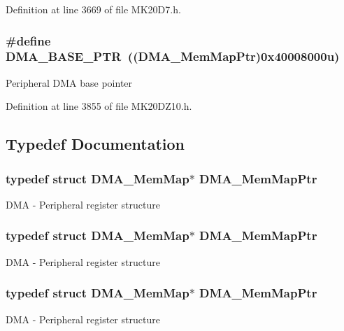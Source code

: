 Definition at line 3669 of file M\+K20\+D7.\+h.

\subsubsection[{\texorpdfstring{D\+M\+A\+\_\+\+B\+A\+S\+E\+\_\+\+P\+TR}{DMA_BASE_PTR}}]{\setlength{\rightskip}{0pt plus 5cm}\#define D\+M\+A\+\_\+\+B\+A\+S\+E\+\_\+\+P\+TR~(({\bf D\+M\+A\+\_\+\+Mem\+Map\+Ptr})0x40008000u)}\hypertarget{group___d_m_a___peripheral_ga6997fbc1b1973e9f27170217a3bd6f22}{}\label{group___d_m_a___peripheral_ga6997fbc1b1973e9f27170217a3bd6f22}
Peripheral D\+MA base pointer 

Definition at line 3855 of file M\+K20\+D\+Z10.\+h.



\subsection{Typedef Documentation}
\subsubsection[{\texorpdfstring{D\+M\+A\+\_\+\+Mem\+Map\+Ptr}{DMA_MemMapPtr}}]{\setlength{\rightskip}{0pt plus 5cm}typedef struct {\bf D\+M\+A\+\_\+\+Mem\+Map}$\ast$ {\bf D\+M\+A\+\_\+\+Mem\+Map\+Ptr}}\hypertarget{group___d_m_a___peripheral_ga160c27c95a39a9791079b32fe7e843a1}{}\label{group___d_m_a___peripheral_ga160c27c95a39a9791079b32fe7e843a1}
D\+MA -\/ Peripheral register structure 
\subsubsection[{\texorpdfstring{D\+M\+A\+\_\+\+Mem\+Map\+Ptr}{DMA_MemMapPtr}}]{\setlength{\rightskip}{0pt plus 5cm}typedef struct {\bf D\+M\+A\+\_\+\+Mem\+Map}$\ast$ {\bf D\+M\+A\+\_\+\+Mem\+Map\+Ptr}}\hypertarget{group___d_m_a___peripheral_ga160c27c95a39a9791079b32fe7e843a1}{}\label{group___d_m_a___peripheral_ga160c27c95a39a9791079b32fe7e843a1}
D\+MA -\/ Peripheral register structure 
\subsubsection[{\texorpdfstring{D\+M\+A\+\_\+\+Mem\+Map\+Ptr}{DMA_MemMapPtr}}]{\setlength{\rightskip}{0pt plus 5cm}typedef struct {\bf D\+M\+A\+\_\+\+Mem\+Map}$\ast$ {\bf D\+M\+A\+\_\+\+Mem\+Map\+Ptr}}\hypertarget{group___d_m_a___peripheral_ga160c27c95a39a9791079b32fe7e843a1}{}\label{group___d_m_a___peripheral_ga160c27c95a39a9791079b32fe7e843a1}
D\+MA -\/ Peripheral register structure 